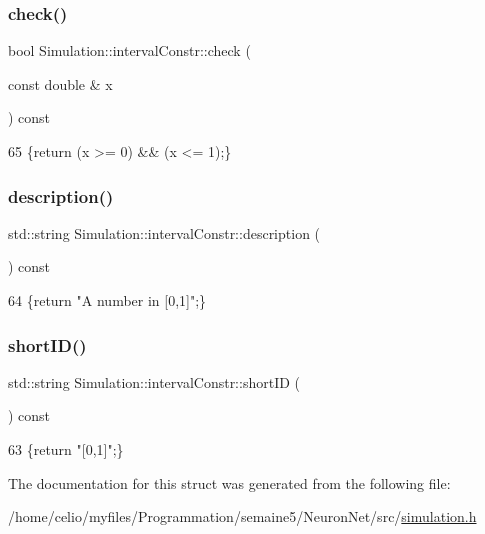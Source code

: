 \subsubsection{\texorpdfstring{check()}{check()}}
{\footnotesize\ttfamily bool Simulation\+::interval\+Constr\+::check (\begin{DoxyParamCaption}\item[{const double \&}]{x }\end{DoxyParamCaption}) const\hspace{0.3cm}{\ttfamily [inline]}}


\begin{DoxyCode}
65 \{\textcolor{keywordflow}{return} (x >= 0) && (x <= 1);\}
\end{DoxyCode}
\mbox{\label{structSimulation_1_1intervalConstr_acd0d4140e524a5017441f3d10ca9d3bf}} 
\subsubsection{\texorpdfstring{description()}{description()}}
{\footnotesize\ttfamily std\+::string Simulation\+::interval\+Constr\+::description (\begin{DoxyParamCaption}{ }\end{DoxyParamCaption}) const\hspace{0.3cm}{\ttfamily [inline]}}


\begin{DoxyCode}
64 \{\textcolor{keywordflow}{return} \textcolor{stringliteral}{"A number in [0,1]"};\}
\end{DoxyCode}
\mbox{\label{structSimulation_1_1intervalConstr_a100c7d32a4c1e571e15bbc7463fee2b2}} 
\subsubsection{\texorpdfstring{short\+I\+D()}{shortID()}}
{\footnotesize\ttfamily std\+::string Simulation\+::interval\+Constr\+::short\+ID (\begin{DoxyParamCaption}{ }\end{DoxyParamCaption}) const\hspace{0.3cm}{\ttfamily [inline]}}


\begin{DoxyCode}
63 \{\textcolor{keywordflow}{return} \textcolor{stringliteral}{"[0,1]"};\}
\end{DoxyCode}


The documentation for this struct was generated from the following file\+:\begin{DoxyCompactItemize}
\item 
/home/celio/myfiles/\+Programmation/semaine5/\+Neuron\+Net/src/\hyperlink{simulation_8h}{simulation.\+h}\end{DoxyCompactItemize}
